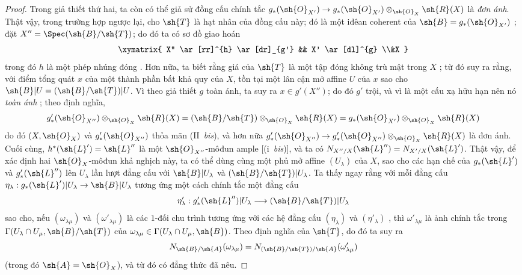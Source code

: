 \documentclass[oneside,10pt]{amsart}
\makeatletter
\newcommand{\ega@arrow}[2]{\mathchoice{#1}{#2}{#2}{#2}}
\renewcommand{\to}{\ega@arrow{\longrightarrow}{\rightarrow}}
\newcommand{\oldpage}[2][]{\marginnote{\normalfont\footnotesize\textbf{#1}~|~#2}\ignorespaces}
\makeatother
\begin{document}
\begin{proof}
Trong giả thiết thứ hai, ta còn có thể giả sử đồng cấu chính tắc $g_*(\sh{O}_{X'})\to g_*(\sh{O}_{X'})\otimes_{\sh{O}_X}\sh{R}(X)$ là \emph{đơn ánh}.
Thật vậy, trong trường hợp ngược lại, cho $\sh{T}$
\oldpage[II]{131}
là hạt nhân của đồng cấu này; đó là một iđêan coherent của $\sh{B}=g_*(\sh{O}_{X'})$ ; đặt $X''=\Spec(\sh{B}/\sh{T})$;
do đó ta có sơ đồ giao hoán
\[
  \xymatrix{
    X'' \ar[rr]^{h} \ar[dr]_{g'}
    && X' \ar[dl]^{g}
  \\&X
  }
\]
trong đó $h$ là một phép nhúng đóng .
Hơn nữa, ta biết rằng giá của $\sh{T}$ là một tập đóng  không trù mật trong $X$ ; từ đó suy ra rằng, với điểm tổng quát $x$ của một thành phần bất khả quy của $X$, tồn tại một lân cận mở affine $U$ của $x$ sao cho $\sh{B}|U=(\sh{B}/\sh{T})|U$.
Vì theo giả thiết $g$ toàn ánh, ta suy ra $x\in g'(X'')$;
do đó $g'$ trội, và vì là một cấu xạ hữu hạn nên nó \emph{toàn ánh} ;
theo định nghĩa,
\[
  g'_*(\sh{O}_{X''})\otimes_{\sh{O}_X}\sh{R}(X)
  = (\sh{B}/\sh{T})\otimes_{\sh{O}_X}\sh{R}(X)
  = g_*(\sh{O}_{X'})\otimes_{\sh{O}_X}\sh{R}(X)
\]
do đó $(X,\sh{O}_X)$ và $g'_*(\sh{O}_{X''})$ thỏa mãn (II~\emph{bis}), và hơn nữa $g'_*(\sh{O}_{X''})\to g'_*(\sh{O}_{X''})\otimes_{\sh{O}_X}\sh{R}(X)$ là đơn ánh.
Cuối cùng, $h^*(\sh{L}')=\sh{L}''$ là một $\sh{O}_{X''}$-môđun ample [(i~\emph{bis})], và ta có $N_{X''/X}(\sh{L}'')=N_{X'/X}(\sh{L}')$.
Thật vậy, để xác định hai $\sh{O}_X$-môđun khả nghịch này, ta có thể dùng cùng một phủ mở affine $(U_\lambda)$ của $X$, sao cho các hạn chế của $g_*(\sh{L}')$ và $g'_*(\sh{L}'')$ lên $U_\lambda$ lần lượt đẳng cấu với $\sh{B}|U_\lambda$ và $(\sh{B}/\sh{T})|U_\lambda$.
Ta thấy ngay rằng với mỗi đẳng cấu $\eta_\lambda:g_*(\sh{L}')|U_\lambda\to\sh{B}|U_\lambda$ tương ứng một cách chính tắc một đẳng cấu
\[
  \eta'_\lambda : g'_*(\sh{L}'')|U_\lambda \to (\sh{B}/\sh{T})|U_\lambda
\]
sao cho, nếu $(\omega_{\lambda\mu})$ và $(\omega'_{\lambda\mu})$ là các $1$-đối chu trình tương ứng với các hệ đẳng cấu $(\eta_\lambda)$ và $(\eta'_\lambda)$ , thì $\omega'_{\lambda\mu}$ là ảnh chính tắc trong $\Gamma(U_\lambda\cap U_\mu,\sh{B}/\sh{T})$ của $\omega_{\lambda\mu}\in\Gamma(U_\lambda\cap U_\mu,\sh{B})$.
Theo định nghĩa của $\sh{T}$, do đó ta suy ra
\[
  N_{\sh{B}/\sh{A}}(\omega_{\lambda\mu}) = N_{(\sh{B}/\sh{T})/\sh{A}}(\omega'_{\lambda\mu})
\]
(trong đó $\sh{A}=\sh{O}_X$), và từ đó có đẳng thức đã nêu.


\end{proof}
\end{document}
